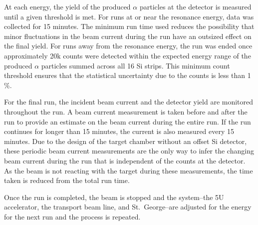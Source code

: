 At each energy, the yield of the produced $\alpha$ particles at the
detector is measured until a given threshold is met. For runs at or near
the resonance energy, data was collected for 15 minutes. The minimum run
time used reduces the possibility that minor fluctuations in the beam
current during the run have an outsized effect on the final yield. For
runs away from the resonance energy, the run was ended once
approximately 20k counts were detected within the expected energy range
of the produced $\alpha$ particles summed across all 16 Si strips. This
minimum count threshold ensures that the statistical uncertainty due to
the counts is less than 1\,\%.

For the final run, the incident beam current and the detector yield are
monitored throughout the run. A beam current measurement is taken before
and after the run to provide an estimate on the beam current during the
entire run. If the run continues for longer than 15 minutes, the current
is also measured every 15 minutes. Due to the design of the target
chamber without an offset Si detector, these periodic beam current
measurements are the only way to infer the changing beam current during
the run that is independent of the counts at the detector. As the beam
is not reacting with the target during these measurements, the time
taken is reduced from the total run time.

Once the run is completed, the beam is stopped and the system\---{}the
5U accelerator, the transport beam line, and St.\ George\---{}are
adjusted for the energy for the next run and the process is repeated.
